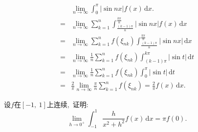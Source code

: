 	\begin{solution}
		\begin{align*}
			&\lim\limits_{n\rightarrow\infty}\int_{0}^{\pi}\left|\sin nx\right|f(x)\,\text{d}x.\\
			=&\lim\limits_{n\rightarrow\infty}\sum\limits_{k=1}^{n}\int_{\frac{(k-1)\pi}{n}}^{\frac{k\pi}{n}}\left|\sin nx\right|f(x)\,\text{d}x\\
			=&\lim\limits_{n\rightarrow\infty}\sum\limits_{k=1}^{n}f(\xi_{nk})\int_{\frac{(k-1)\pi}{n}}^{\frac{k\pi}{n}}\left|\sin nx\right|\,\text{d}x\\
			=&\lim\limits_{n\rightarrow\infty}\frac{1}{n}\sum\limits_{k=1}^{n}f(\xi_{nk})\int_{(k-1)\pi}^{k\pi}\left|\sin t\right|\,\text{d}t\\
			=&\lim\limits_{n\rightarrow\infty}\frac{1}{n}\sum\limits_{k=1}^{n}f(\xi_{nk})\int_{0}^{\pi}\left|\sin t\right|\,\text{d}t\\
			=&\frac{2}{\pi}\lim\limits_{n\rightarrow\infty}\frac{\pi}{n}\sum\limits_{k=1}^{n}f(\xi_{nk})=\frac{2}{\pi}f(x)\,\text{d}x.
		\end{align*} 
	\end{solution}
	
	\newpage
	\begin{problem}
		设$f$在$\left[-1,\ 1\right]$上连续,\ 证明:
		$$\lim\limits_{h\rightarrow0^+}\int_{-1}^{1}\frac{h}{x^2+h^2}f(x)\,\text{d}x=\pi f(0).$$
	\end{problem}
	
